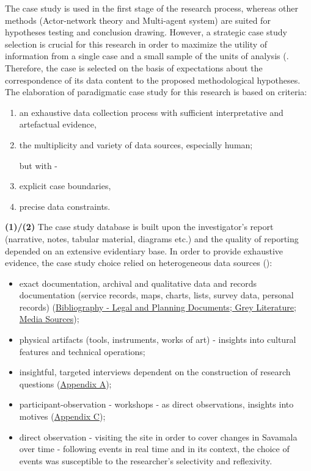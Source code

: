 \documentclass[11pt]{report}
\begin{document}
The case study is used in the first stage of the research process, whereas other methods (Actor-network theory and Multi-agent system) are suited for hypotheses testing and conclusion drawing. However, a strategic case study selection is crucial for this research in order to maximize the utility of information from a single case and a small sample of the units of analysis  (\href{Flyvbjerg}{\cite{flyvbjerg_five_2006}}.
Therefore, the case is selected on the basis of expectations about the correspondence of its data content to the proposed methodological hypotheses. The elaboration of paradigmatic case study for this research is based on \href{Yin}{\citealt{yin_case_2009}} criteria:

\begin{enumerate}
\item an exhaustive data collection process with sufficient interpretative and artefactual evidence,
\item the multiplicity and variety of data sources, especially human;

but with - 
\item explicit case boundaries,
\item precise data constraints.
\end{enumerate}

\textbf{(1)/(2) }The case study database is built upon the investigator’s report (narrative, notes, tabular material, diagrams etc.) and the quality  of reporting depended on an extensive evidentiary base. In order to provide exhaustive evidence, the case study choice relied on heterogeneous data sources (\href{Yin}{\citealt{yin_case_2003}}):

\begin{itemize}
\item exact documentation, archival and qualitative data and records documentation (service records, maps, charts, lists, survey data, personal records) (\href{Bibliography}{Bibliography - Legal and Planning Documents; Grey Literature; Media Sources});
\item physical artifacts (tools, instruments, works of art) - insights into cultural features and technical operations;
\item insightful, targeted interviews dependent  on the construction of research questions (\href{Appendix}{Appendix A});
\item participant-observation - workshops -  as direct observations, insights into motives (\href{Appendix}{Appendix C});
\item direct observation - visiting the site in order to cover changes in Savamala over time
- following events in real time and in its context, the choice of events was susceptible to the researcher’s selectivity and reflexivity.
\end{itemize}
\end{document}
